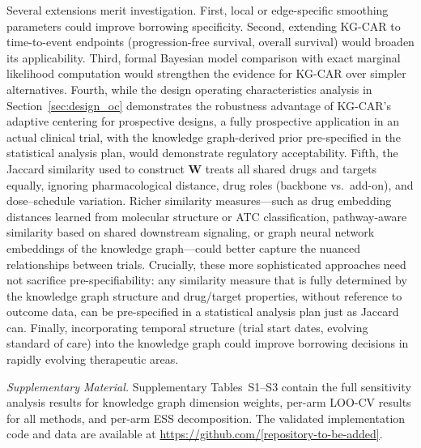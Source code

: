 \documentclass[12pt]{article}
\newcommand{\bW}{\mathbf{W}}
\begin{document}
Several extensions merit investigation. First, local or edge-specific smoothing parameters could improve borrowing specificity. Second, extending KG-CAR to time-to-event endpoints (progression-free survival, overall survival) would broaden its applicability. Third, formal Bayesian model comparison with exact marginal likelihood computation would strengthen the evidence for KG-CAR over simpler alternatives. Fourth, while the design operating characteristics analysis in Section~\ref{sec:design_oc} demonstrates the robustness advantage of KG-CAR's adaptive centering for prospective designs, a fully prospective application in an actual clinical trial, with the knowledge graph-derived prior pre-specified in the statistical analysis plan, would demonstrate regulatory acceptability. Fifth, the Jaccard similarity used to construct $\bW$ treats all shared drugs and targets equally, ignoring pharmacological distance, drug roles (backbone vs.\ add-on), and dose--schedule variation. Richer similarity measures---such as drug embedding distances learned from molecular structure or ATC classification, pathway-aware similarity based on shared downstream signaling, or graph neural network embeddings of the knowledge graph---could better capture the nuanced relationships between trials. Crucially, these more sophisticated approaches need not sacrifice pre-specifiability: any similarity measure that is fully determined by the knowledge graph structure and drug/target properties, without reference to outcome data, can be pre-specified in a statistical analysis plan just as Jaccard can. Finally, incorporating temporal structure (trial start dates, evolving standard of care) into the knowledge graph could improve borrowing decisions in rapidly evolving therapeutic areas.

\vspace{12pt}
\noindent\textit{Supplementary Material.}
Supplementary Tables~S1--S3 contain the full sensitivity analysis results for knowledge graph dimension weights, per-arm LOO-CV results for all methods, and per-arm ESS decomposition. The validated implementation code and data are available at \url{https://github.com/[repository-to-be-added]}.

\end{document}
